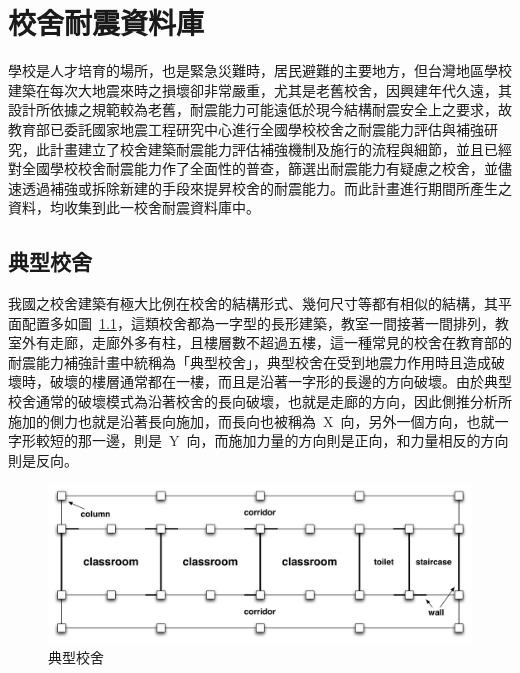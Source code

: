 \renewcommand\thetable{\arabic{chapter}-\arabic{table}}
\renewcommand{\theequation}{\arabic{chapter}-\arabic{equation}}
\chapter{校舍耐震資料庫}

學校是人才培育的場所，也是緊急災難時，居民避難的主要地方，但台灣地區學校建築在每次大地震來時之損壞卻非常嚴重，尤其是老舊校舍，因興建年代久遠，其設計所依據之規範較為老舊，耐震能力可能遠低於現今結構耐震安全上之要求，故教育部已委託國家地震工程研究中心進行全國學校校舍之耐震能力評估與補強研究，此計畫建立了校舍建築耐震能力評估補強機制及施行的流程與細節，並且已經對全國學校校舍耐震能力作了全面性的普查，篩選出耐震能力有疑慮之校舍，並儘速透過補強或拆除新建的手段來提昇校舍的耐震能力。而此計畫進行期間所產生之資料，均收集到此一校舍耐震資料庫中。

\section{典型校舍}

我國之校舍建築有極大比例在校舍的結構形式、幾何尺寸等都有相似的結構，其平面配置多如圖~\ref{fig:TSB}，這類校舍都為一字型的長形建築，教室一間接著一間排列，教室外有走廊，走廊外多有柱，且樓層數不超過五樓，這一種常見的校舍在教育部的耐震能力補強計畫中統稱為「典型校舍」，典型校舍在受到地震力作用時且造成破壞時，破壞的樓層通常都在一樓，而且是沿著一字形的長邊的方向破壞。由於典型校舍通常的破壞模式為沿著校舍的長向破壞，也就是走廊的方向，因此側推分析所施加的側力也就是沿著長向施加，而長向也被稱為~X~向，另外一個方向，也就一字形較短的那一邊，則是~Y~向，而施加力量的方向則是正向，和力量相反的方向則是反向。

\begin{figure}[hbtp]
  \begin{center}
    \includegraphics[width=1.0\textwidth]{figures/trad-school-building.pdf}
    \caption{典型校舍} 
    \label{fig:TSB}
  \end{center}
\end{figure}

